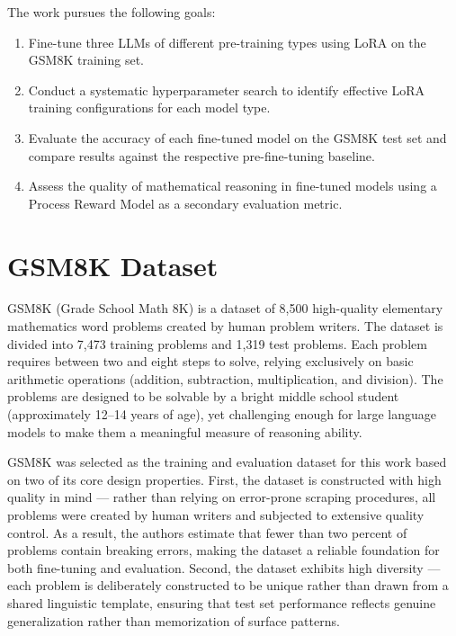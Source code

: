   The work pursues the following goals:

  \begin{enumerate}
      \item Fine-tune three LLMs of different pre-training types
      using LoRA on the GSM8K training set.
      \item Conduct a systematic hyperparameter search to identify
      effective LoRA training configurations for each model type.
      \item Evaluate the accuracy of each fine-tuned model on the
      GSM8K test set and compare results against the respective
      pre-fine-tuning baseline.
      \item Assess the quality of mathematical reasoning in
      fine-tuned models using a Process Reward Model as a
      secondary evaluation metric.
  \end{enumerate}


\section{GSM8K Dataset}
\label{sec:gsm8k}



GSM8K (Grade School Math 8K)  \cite{cobbe2021} is a dataset of 8,500 high-quality
  elementary mathematics word problems created by human problem
  writers. The dataset is divided into 7,473
  training problems and 1,319 test problems. Each problem requires
  between two and eight steps to solve, relying exclusively on basic
  arithmetic operations (addition, subtraction, multiplication, and
  division). The problems are designed to be solvable by a bright middle
  school student (approximately 12--14 years of age), yet challenging enough for large
  language models
  to make them a meaningful measure of reasoning ability.

  GSM8K was selected as the training and evaluation dataset for
  this work based on two of its core design properties. First,
  the dataset is constructed with high quality in mind --- rather
  than relying on error-prone scraping procedures, all problems
  were created by human writers and subjected to extensive quality
  control. As a result, the authors estimate that fewer
  than two percent of problems contain breaking
  errors, making the dataset
  a reliable foundation for both fine-tuning
  and evaluation. Second, the
  dataset exhibits high diversity --- each problem is deliberately
  constructed to be unique rather than drawn from a shared
  linguistic template, ensuring that test set performance reflects
  genuine generalization rather than memorization of surface
  patterns.

